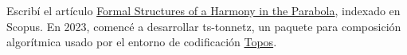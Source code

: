 \documentclass[letterpaper,10pt,oneside]{article}
\begin{document}




\vspace{2em}

\noindent Escribí el artículo \href{https://link.springer.com/chapter/10.1007/978-3-031-07015-0_30}{Formal Structures of a Harmony in the Parabola}, indexado en Scopus. En 2023, comencé a desarrollar ts-tonnetz, un paquete para composición algorítmica usado por el entorno de codificación \href{https://topos.live/#ziffers_tonnetz}{Topos}.
\end{document}
